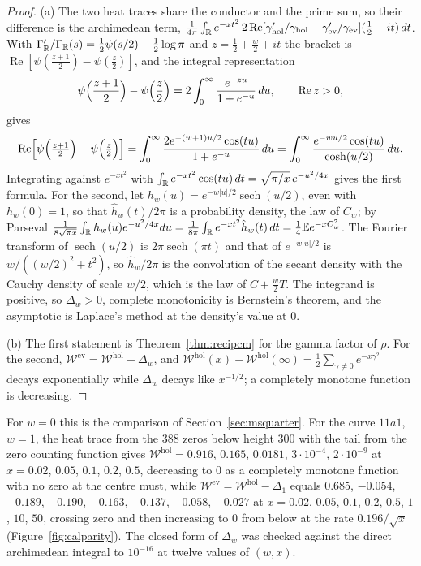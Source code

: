 \begin{proof}
(a) The two heat traces share the conductor and the prime sum, so their difference is the archimedean term, $\frac1{4\pi}\int_{\mathbb{R}} e^{-xt^2}\,2\operatorname{Re}[\gamma'_{\mathrm{hol}}/\gamma_{\mathrm{hol}}-\gamma'_{\mathrm{ev}}/\gamma_{\mathrm{ev}}](\tfrac12+it)\,dt$. With $\Gamma_{\mathbb{R}}'/\Gamma_{\mathbb{R}}(s)=\frac12\psi(s/2)-\frac12\log\pi$ and $z=\frac12+\frac w2+it$ the bracket is $\operatorname{Re}[\psi(\frac{z+1}2)-\psi(\frac z2)]$, and the integral representation
\[
\psi\Bigl(\frac{z+1}2\Bigr)-\psi\Bigl(\frac z2\Bigr)=2\int_0^\infty\frac{e^{-zu}}{1+e^{-u}}\,du,\qquad\operatorname{Re}z>0,
\]
gives
\[
\operatorname{Re}\Bigl[\psi\Bigl(\tfrac{z+1}2\Bigr)-\psi\Bigl(\tfrac z2\Bigr)\Bigr]=\int_0^\infty\frac{2e^{-(w+1)u/2}\cos(tu)}{1+e^{-u}}\,du=\int_0^\infty\frac{e^{-wu/2}\cos(tu)}{\cosh(u/2)}\,du .
\]
Integrating against $e^{-xt^2}$ with $\int_{\mathbb{R}} e^{-xt^2}\cos(tu)\,dt=\sqrt{\pi/x}\,e^{-u^2/4x}$ gives the first formula. For the second, let $h_w(u)=e^{-w|u|/2}\operatorname{sech}(u/2)$, even with $h_w(0)=1$, so that $\hat h_w(t)/2\pi$ is a probability density, the law of $C_w$; by Parseval $\frac1{8\sqrt{\pi x}}\int_{\mathbb{R}} h_w(u)e^{-u^2/4x}du=\frac1{8\pi}\int_{\mathbb{R}} e^{-xt^2}\hat h_w(t)\,dt=\frac14\mathbb{E} e^{-xC_w^2}$. The Fourier transform of $\operatorname{sech}(u/2)$ is $2\pi\operatorname{sech}(\pi t)$ and that of $e^{-w|u|/2}$ is $w/((w/2)^2+t^2)$, so $\hat h_w/2\pi$ is the convolution of the secant density with the Cauchy density of scale $w/2$, which is the law of $C+\frac w2T$. The integrand is positive, so $\Delta_w>0$, complete monotonicity is Bernstein's theorem, and the asymptotic is Laplace's method at the density's value at $0$.

(b) The first statement is Theorem~\ref{thm:recipcm} for the gamma factor of $\rho$. For the second, $\mathcal W^{\mathrm{ev}}=\mathcal W^{\mathrm{hol}}-\Delta_w$, and $\mathcal W^{\mathrm{hol}}(x)-\mathcal W^{\mathrm{hol}}(\infty)=\frac12\sum_{\gamma\ne0}e^{-x\gamma^2}$ decays exponentially while $\Delta_w$ decays like $x^{-1/2}$; a completely monotone function is decreasing.
\end{proof}

For $w=0$ this is the comparison of Section~\ref{sec:msquarter}. For the curve $11a1$, $w=1$, the heat trace from the $388$ zeros below height $300$ with the tail from the zero counting function gives $\mathcal W^{\mathrm{hol}}=0.916$, $0.165$, $0.0181$, $3\cdot10^{-4}$, $2\cdot10^{-9}$ at $x=0.02$, $0.05$, $0.1$, $0.2$, $0.5$, decreasing to $0$ as a completely monotone function with no zero at the centre must, while $\mathcal W^{\mathrm{ev}}=\mathcal W^{\mathrm{hol}}-\Delta_1$ equals $0.685$, $-0.054$, $-0.189$, $-0.190$, $-0.163$, $-0.137$, $-0.058$, $-0.027$ at $x=0.02$, $0.05$, $0.1$, $0.2$, $0.5$, $1$, $10$, $50$, crossing zero and then increasing to $0$ from below at the rate $0.196/\sqrt x$ (Figure~\ref{fig:calparity}). The closed form of $\Delta_w$ was checked against the direct archimedean integral to $10^{-16}$ at twelve values of $(w,x)$.

